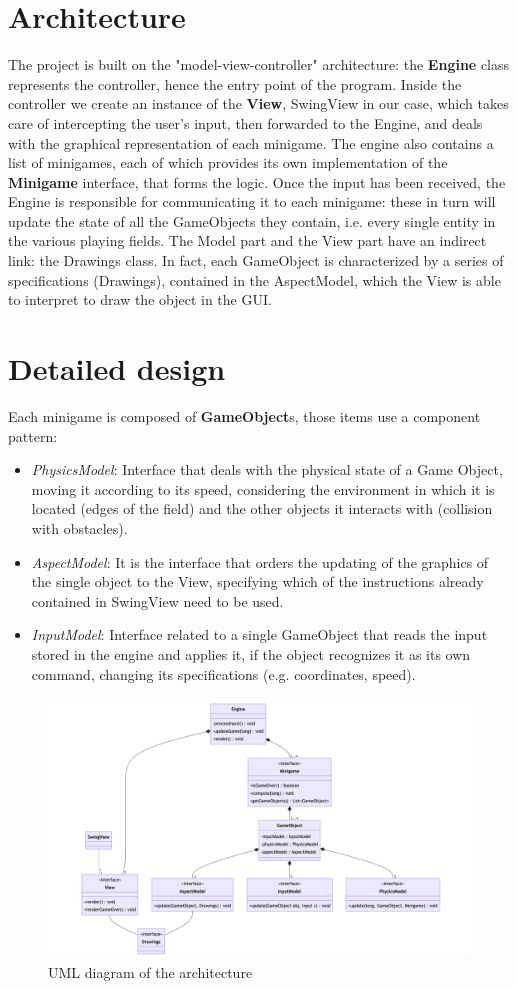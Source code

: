 \documentclass[a4paper,12pt]{report}
\begin{document}
\section{Architecture}
The project is built on the "model-view-controller" architecture: the \textbf{Engine} class represents the controller, hence the entry point of the program.
Inside the controller we create an instance of the \textbf{View}, SwingView in our case, which takes care of intercepting the user's input, then forwarded to the Engine,
and deals with the graphical representation of each minigame. The engine also contains a list of minigames, each of which provides its own implementation of the \textbf{Minigame} interface, that forms the logic.
Once the input has been received, the Engine is responsible for communicating it to each minigame: these in turn will update the state of all the GameObjects they contain, i.e. every single entity in the various playing fields.
The Model part and the View part have an indirect link: the Drawings class. In fact, each GameObject is characterized by a series of specifications (Drawings), contained in the AspectModel, which the View is able to interpret 
to draw the object in the GUI.

\section{Detailed design}
Each minigame is composed of \textbf{GameObject}s, those items use a component pattern:
\begin{itemize}
	\item \textit{PhysicsModel}: Interface that deals with the physical state of a Game Object,
	moving it according to its speed, considering the environment in which it is located (edges of the field) 
	and the other objects it interacts with (collision with obstacles).
	\pagebreak
	\item \textit{AspectModel}: It is the interface that orders the updating of the graphics of the single 
	object to the View, specifying which of the instructions already contained in SwingView need to be used.
	\item \textit{InputModel}: Interface related to a single GameObject that reads the input stored in the 
	engine and applies it, if the object recognizes it as its own command, changing its specifications (e.g. coordinates, speed).
\end{itemize}

\begin{figure}[ht]
	\centering{}
	\includegraphics[width=\textwidth]{architecture.png}
	\caption{UML diagram of the architecture}
\end{figure}
\end{document}
